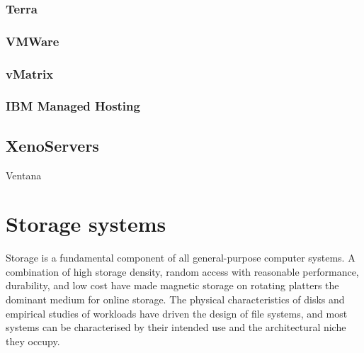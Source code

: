 \subsubsection{Terra}
\cite{garfinkel}
\subsubsection{VMWare}
\subsubsection{vMatrix}
\subsubsection{IBM Managed Hosting}

\subsection{XenoServers}
\cite{kotsovinos}

Ventana \cite{pfaff}

\section{Storage systems}

Storage is a fundamental component of all general-purpose computer systems. A combination of high storage density, random access with reasonable performance, durability, and low cost have made magnetic storage on rotating platters the dominant medium for online storage. The physical characteristics of disks and empirical studies of workloads have driven the design of file systems, and most systems can be characterised by their intended use and the architectural niche they occupy.

% 

